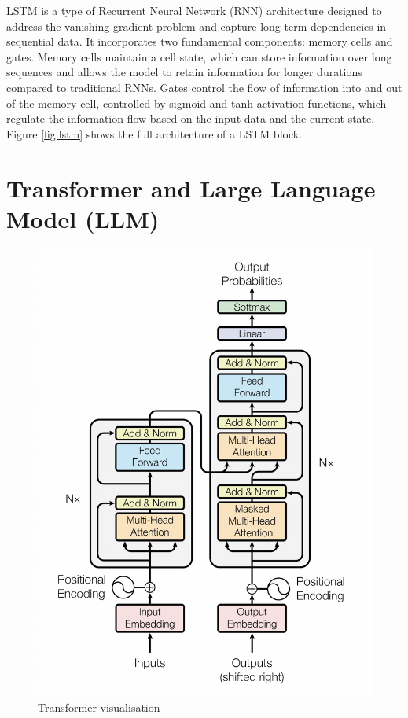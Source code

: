 LSTM \cite{hochreiter-1997-lstm} is a type of Recurrent Neural Network (RNN) architecture designed to address the vanishing gradient problem and capture long-term dependencies in sequential data. It incorporates two fundamental components: memory cells and gates. Memory cells maintain a cell state, which can store information over long sequences and allows the model to retain information for longer durations compared to traditional RNNs. Gates control the flow of information into and out of the memory cell, controlled by sigmoid and tanh activation functions, which regulate the information flow based on the input data and the current state. Figure \ref{fig:lstm} shows the full architecture of a LSTM block.


\section{Transformer and Large Language Model (LLM)}

\begin{figure}[htbp]
    \centering
    \includegraphics[width=0.7\linewidth]{images/transformer.png}
    \caption{Transformer visualisation \cite{vaswani-2023-attention}}
    \label{fig:transformer}
\end{figure}

